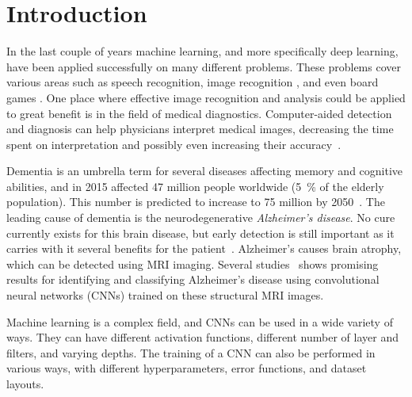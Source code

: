 \documentclass{kththesis}
\begin{document}
\setcounter{secnumdepth}{2}
\setcounter{tocdepth}{2}
\tableofcontents


\mainmatter

\chapter{Introduction}
In the last couple of years machine learning, and more specifically deep learning, have been applied successfully on many different problems. These problems cover various areas such as speech recognition, image recognition \parencite{krizhevsky2012imagenet}, and even board games \parencite{silver2018general}. One place where effective image recognition and analysis could be applied to great benefit is in the field of medical diagnostics. Computer-aided detection and diagnosis can help physicians interpret medical images, decreasing the time spent on interpretation and possibly even increasing their accuracy~\cite{erickson2017machine}.

Dementia is an umbrella term for several diseases affecting memory and cognitive abilities, and in 2015 affected 47 million people worldwide (5~\% of the elderly population). This number is predicted to increase to 75 million by 2050~\cite{dementiaWHO}. The leading cause of dementia is the neurodegenerative \textit{Alzheimer’s disease}. No cure currently exists for this brain disease, but early detection is still important as it carries with it several benefits for the patient~\cite{factsfigures2018}. Alzheimer's causes brain atrophy, which can be detected using MRI imaging. Several studies~\cite{islam2017novel, islam2018early} shows promising results for identifying and classifying Alzheimer’s disease using convolutional neural networks (CNNs) trained on these structural MRI images.

Machine learning is a complex field, and CNNs can be used in a wide variety of ways. They can have different activation functions, different number of layer and filters, and varying depths. The training of a CNN can also be performed in various ways, with different hyperparameters, error functions, and dataset layouts.
\end{document}
